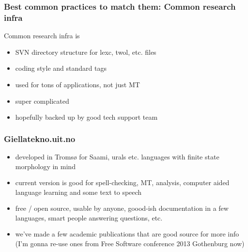 \documentclass[10pt,xetex]{beamer} %
\begin{document}
\begin{frame}
  \frametitle{Best common practices to match them: Common research infra}

  Common research infra is
\begin{itemize}
    \item SVN directory structure for lexc, twol, etc. files
    \item coding style and standard tags
    \item used for tons of applications, not just MT
    \item super complicated
    \item hopefully backed up by good tech support team
\end{itemize}

\end{frame}

\begin{frame}
    \frametitle{Giellatekno.uit.no}
    \begin{itemize}
        \item developed in Tromsø for Saami, urals etc. languages with
            finite state morphology in mind
        \item current version is good for spell-checking, MT, analysis,
            computer aided language learning and some text to speech
        \item free / open source, usable by anyone, goood-ish documentation
            in a few languages, smart people answering questions, etc.
        \item we've made a few academic publications that are good source for
            more info (I'm gonna re-use ones from Free Software conference 2013
            Gothenburg now)
    \end{itemize}
\end{frame}
\end{document}
